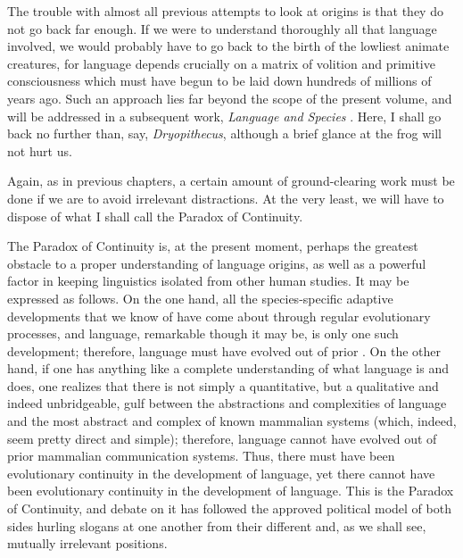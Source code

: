 The trouble with almost all previous attempts to look at origins is that they do not go back far enough. If we were to understand thoroughly all that language involved, we would probably have to go back to the birth of the lowliest animate creatures, for language depends crucially on a matrix of volition and primitive consciousness which must have begun to be laid down hundreds of millions of years ago. Such an approach lies far beyond the scope of the present volume, and will be addressed in a subsequent work, \textit{Language and Species} \citep{Bickerton1990}. Here, I shall go back no further than, say, \textit{Dryopithecus}, although a brief glance at the frog will not hurt us.

Again, as in previous chapters, a certain amount of ground-clearing work must be done if we are to avoid irrelevant distractions. At the very least, we will have to dispose of what I shall call the Paradox of Continuity.

The Paradox of Continuity is, at the present moment, perhaps the greatest obstacle to a proper understanding of language origins, as well as a powerful factor in keeping linguistics isolated from other human studies. It may be expressed as follows. On the one hand, all the species-specific adaptive developments that we know of have come about through regular evolutionary processes, and language, remarkable though it may be, is only one such development; therefore, language must have evolved out of prior . On the other hand, if one has anything like a complete understanding of what language is and does, one realizes that there is not simply a quantitative, but a qualitative and indeed unbridgeable, gulf between
the abstractions and complexities of language and the most abstract and complex of known mammalian systems (which, indeed, seem pretty direct and simple); therefore, language cannot have evolved out of prior mammalian communication systems. Thus, there must have been evolutionary continuity in the development of language, yet there cannot have been evolutionary continuity in the development of language. This is the Paradox of Continuity, and debate on it has followed the approved political model of both sides hurling slogans at one another from their different and,\enlargethispage{1\baselineskip} as we shall see, mutually irrele\-vant positions.%

